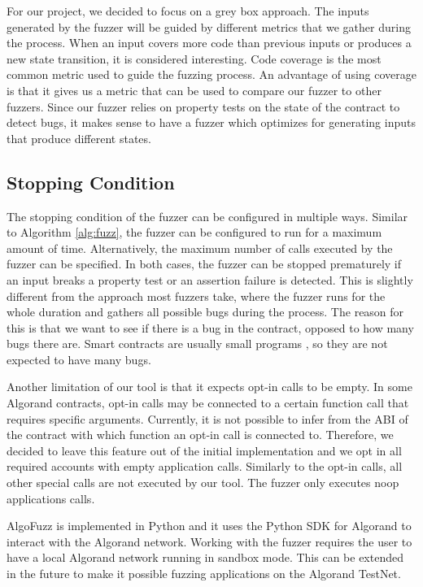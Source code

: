 For our project, we decided to focus on a grey box approach.
The inputs generated by the fuzzer will be guided by different metrics that we gather during the process.
When an input covers more code than previous inputs or produces a new state transition, it is considered interesting.
Code coverage is the most common metric used to guide the fuzzing process.
An advantage of using coverage is that it gives us a metric that can be used to compare our fuzzer to other fuzzers.
Since our fuzzer relies on property tests on the state of the contract to detect bugs, it makes sense to have a fuzzer which optimizes for generating inputs that produce different states.

\subsection*{Stopping Condition}
The stopping condition of the fuzzer can be configured in multiple ways.
Similar to Algorithm \ref{alg:fuzz}, the fuzzer can be configured to run for a maximum amount of time.
Alternatively, the maximum number of calls executed by the fuzzer can be specified.
In both cases, the fuzzer can be stopped prematurely if an input breaks a property test or an assertion failure is detected.
This is slightly different from the approach most fuzzers take, where the fuzzer runs for the whole duration and gathers all possible bugs during the process.
The reason for this is that we want to see if there is a bug in the contract, opposed to how many bugs there are.
Smart contracts are usually small programs \cite{gao_checking_2021}, so they are not expected to have many bugs.

Another limitation of our tool is that it expects opt-in calls to be empty.
In some Algorand contracts, opt-in calls may be connected to a certain function call that requires specific arguments.
Currently, it is not possible to infer from the \ac{ABI} of the contract with which function an opt-in call is connected to.
Therefore, we decided to leave this feature out of the initial implementation and we opt in all required accounts with empty application calls.
Similarly to the opt-in calls, all other special calls are not executed by our tool.
The fuzzer only executes noop applications calls.

AlgoFuzz is implemented in Python and it uses the Python SDK for Algorand to interact with the Algorand network.
Working with the fuzzer requires the user to have a local Algorand network running in sandbox mode.
This can be extended in the future to make it possible fuzzing applications on the Algorand TestNet.

